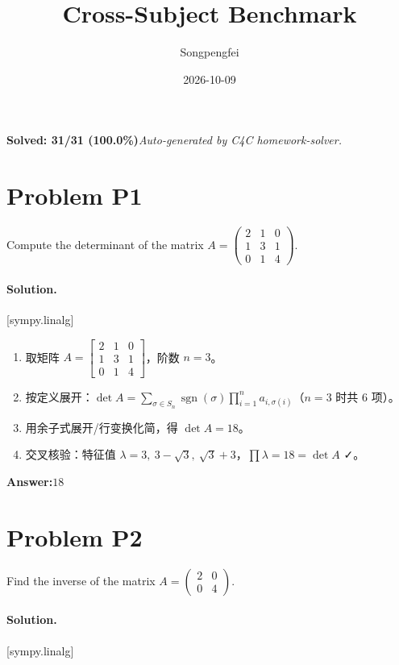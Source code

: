 \documentclass[11pt,a4paper]{ctexart}
\title{Cross-Subject Benchmark}
\author{Songpengfei}
\date{2026-10-09}
\newcommand{\solvertag}[1]{{\footnotesize\color{gray}\textsf{[#1]}}}
\begin{document}
\maketitle

\noindent\textbf{Solved: 31/31 (100.0\%)}\quad\textit{Auto-generated by C4C homework-solver.}

\section*{Problem P1}
Compute the determinant of the matrix $A = \begin{pmatrix} 2 & 1 & 0 \\ 1 & 3 & 1 \\ 0 & 1 & 4 \end{pmatrix}$.

\paragraph{Solution.} \solvertag{sympy.linalg} 

\begin{enumerate}[leftmargin=*]
  \item 取矩阵 $A = \left[\begin{matrix}2 & 1 & 0\\1 & 3 & 1\\0 & 1 & 4\end{matrix}\right]$，阶数 $n = 3$。
  \item 按定义展开：$\det A = \sum_{\sigma \in S_n} \operatorname{sgn}(\sigma)\prod_{i=1}^{n} a_{i,\sigma(i)}$（$n=3$ 时共 $6$ 项）。
  \item 用余子式展开/行变换化简，得 $\det A = 18$。
  \item 交叉核验：特征值 $\lambda = 3,\ 3 - \sqrt{3},\ \sqrt{3} + 3$，$\prod \lambda = 18 = \det A$ ✓。
\end{enumerate}

\noindent\textbf{Answer:}\quad $18$

\medskip

\section*{Problem P2}
Find the inverse of the matrix $A = \begin{pmatrix} 2 & 0 \\ 0 & 4 \end{pmatrix}$.

\paragraph{Solution.} \solvertag{sympy.linalg} 
\end{document}
